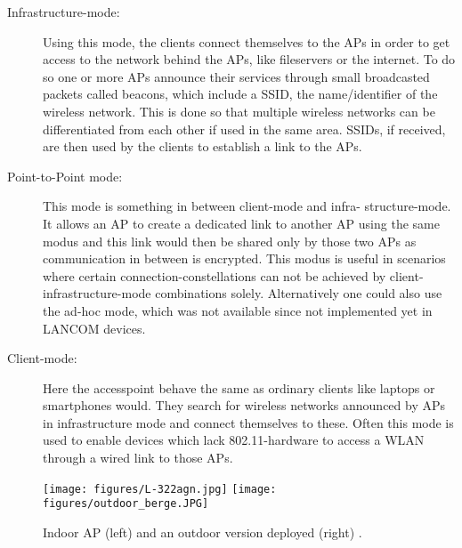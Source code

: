     \begin{description}
      \item[Infrastructure-mode:]
	Using this mode, the clients connect themselves to the APs in order to get access to the network behind the APs, like fileservers or the internet.
	To do so one or more APs announce their services through small broadcasted packets called beacons, which include a \ac{SSID}, 
	the name/identifier of the wireless network. This is done so that multiple wireless networks can be differentiated from each other if used in the same area. 
	SSIDs, if received, are then used by the clients to establish a link to the APs.

      \item [Point-to-Point mode:]
	This mode is something in between client-mode and infra-
	structure-mode. 
	It allows an AP to create a dedicated link to another AP using the same modus and this link would then be shared only by those two APs
	as communication in between is encrypted. This modus is useful in scenarios where certain connection-constellations can not be achieved by 
	client-infrastructure-mode combinations solely. Alternatively one could also use the ad-hoc mode, which was not available since not implemented yet in LANCOM devices.
	
      \item [Client-mode:]
	Here the accesspoint behave the same as ordinary clients like laptops or smartphones would.
	They search for wireless networks announced by APs in infrastructure mode and connect themselves to these.
	Often this mode is used to enable devices which lack 802.11-hardware to access a \ac{WLAN} through a wired link to those APs.
    \end{description}
    
    \begin{figure}[bh!]
      \centerline{
	\texttt{[image: figures/L-322agn.jpg]}
	\texttt{[image: figures/outdoor\_berge.JPG]}
      }
      \caption{Indoor \ac{AP} (left) and an outdoor version deployed (right) \cite{lancom}.}
      \label{fig:L-322agn}
    \end{figure}
    
    \newpage
     
